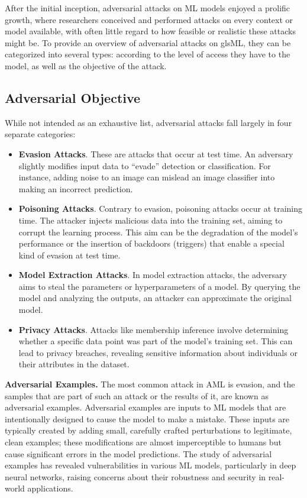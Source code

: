 After the initial inception, adversarial attacks on ML models enjoyed a prolific growth, where researchers conceived and performed attacks on every context or model available, with often little regard to how feasible or realistic these attacks might be.
To provide an overview of adversarial attacks on gls{ML}, they can be categorized into several types: according to the level of access they have to the model, as well as the objective of the attack.

\subsection{Adversarial Objective}

While not intended as an exhaustive list, adversarial attacks fall largely in four separate categories:

\begin{itemize}
    \item \textbf{Evasion Attacks}. These are attacks that occur at test time. An adversary slightly modifies input data to ``evade'' detection or classification. For instance, adding noise to an image can mislead an image classifier into making an incorrect prediction.
    \item \textbf{Poisoning Attacks}. Contrary to evasion, poisoning attacks occur at training time. The attacker injects malicious data into the training set, aiming to corrupt the learning process. This aim can be the degradation of the model's performance or the insertion of backdoors (triggers) that enable a special kind of evasion at test time.
    \item \textbf{Model Extraction Attacks}. In model extraction attacks, the adversary aims to steal the parameters or hyperparameters of a model. By querying the model and analyzing the outputs, an attacker can approximate the original model.
    \item \textbf{Privacy Attacks}. Attacks like membership inference involve determining whether a specific data point was part of the model's training set. This can lead to privacy breaches, revealing sensitive information about individuals or their attributes in the dataset.
\end{itemize}

\textbf{Adversarial Examples.} The most common attack in \gls{AML} is evasion, and the samples that are part of such an attack or the results of it, are known as adversarial examples.
Adversarial examples are inputs to \gls{ML} models that are intentionally designed to cause the model to make a mistake.
These inputs are typically created by adding small, carefully crafted perturbations to legitimate, clean examples; these modifications are almost imperceptible to humans but cause significant errors in the model predictions.
The study of adversarial examples has revealed vulnerabilities in various \gls{ML} models, particularly in deep neural networks, raising concerns about their robustness and security in real-world applications.

